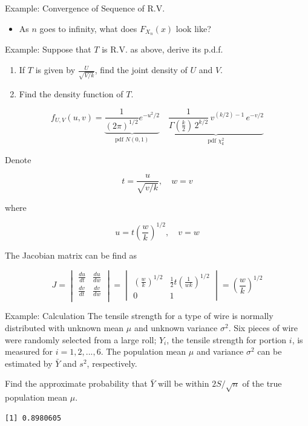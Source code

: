 \documentclass[
  ignorenonframetext,
  aspectratio=43,
]{beamer}
\providecommand{\tightlist}{%
  \setlength{\itemsep}{0pt}\setlength{\parskip}{0pt}}\usepackage{longtable,booktabs,array}
\begin{document}
\begin{frame}{Example: Convergence of Sequence of R.V.}
\label{example-convergence-of-sequence-of-r.v.-2}
\begin{itemize}
\tightlist
\item
  As \(n\) goes to infinity, what does \(F_{X_n}(x)\) look like?
\end{itemize}
\end{frame}

\begin{frame}{Example: Suppose that \(T\) is R.V. as above, derive its
p.d.f.}
\label{example-suppose-that-t-is-r.v.-as-above-derive-its-p.d.f.}
\begin{enumerate}
\item
  If \(T\) is given by \(\frac{U}{\sqrt{V/k}}\), find the joint density
  of \(U\) and \(V\).
\item
  Find the density function of \(T\).
\end{enumerate}

\[
f_{U,V}(u,v) = \underbrace{\frac{1}{(2\pi)^{1/2}} e^{-u^2/2}}_{\text{pdf } N(0,1)}\quad \underbrace{\frac{1}{\Gamma(\frac{k}{2})\,2^{k/2}}\,v^{(k/2)-1}\, e^{-v/2}}_{\text{pdf }\chi^2_k}
\]

Denote

\[
t=\frac{u}{\sqrt{v/k}}, \quad w=v
\]

where

\[
u=t(\frac{w}{k})^{1/2}, \quad v= w
\]

The Jacobian matrix can be find as

\[
J=\begin{vmatrix}
   \frac{du}{dt} & \frac{du}{dw}\\
   \frac{dv}{dt} & \frac{dv}{dw}\\
   \end{vmatrix}=\begin{vmatrix}
   (\frac{w}{k})^{1/2} & \frac{1}{2}t(\frac{1}{wk})^{1/2}\\
   0&1
   \end{vmatrix}=(\frac{w}{k})^{1/2}
\]
\end{frame}

\begin{frame}[fragile]{Example: Calculation}
\label{example-calculation}
The tensile strength for a type of wire is normally distributed with
unknown mean \(\mu\) and unknown variance \(\sigma^2\). Six pieces of
wire were randomly selected from a large roll; \(Y_i\), the tensile
strength for portion \(i\), is measured for \(i = 1, 2, . . . , 6\). The
population mean \(\mu\) and variance \(\sigma^2\) can be estimated by
\(\bar{Y}\) and \(s^2\), respectively.

Find the approximate probability that \(\bar{Y}\) will be within
\(2S/\sqrt{n}\) of the true population mean \(\mu\).

\begin{verbatim}
[1] 0.8980605
\end{verbatim}
\end{frame}
\end{document}
